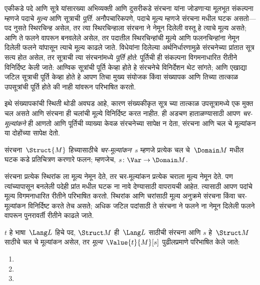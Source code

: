 \begin{explain}
एकीकडे पदे आणि सूत्रे यांसारख्या अभिव्यक्ती आणि दुसरीकडे
संरचना यांना जोडणाऱ्या मूलभूत संकल्पना म्हणजे पदाचे
\emph{मूल्य} आणि सूत्राची \emph{पूर्ति}. अनौपचारिकपणे,
पदाचे मूल्य म्हणजे संरचना मधील घटक असतो---पद
नुसते स्थिरचिन्ह असेल, तर त्या स्थिरचिन्हाला संरचना ने नेमून
दिलेली वस्तू हे त्याचे मूल्य असते; आणि ते फलने वापरून
बनवलेले असेल, तर पदातील स्थिरचिन्हांची मूल्ये आणि फलनचिन्हांना
नेमून दिलेली फलने यांपासून त्याचे मूल्य काढले जाते. विधेयांना
दिलेल्या अर्थनिर्धारणामुळे संरचनेच्या प्रांतात सूत्र सत्य
होत असेल, तर सूत्राची त्या संरचनांमध्ये \emph{पूर्ति
होते}. पूर्तिची ही संकल्पना विगमनाधारित रीतीने विनिर्दिष्ट केली जाते:
आण्विक सूत्रांची पूर्ति केव्हा होते हे संरचनेचे
विनिर्देशन थेट सांगते; आणि एखाद्या जटिल सूत्राची पूर्ति केव्हा
होते हे आपण तिचा मुख्य संयोजक किंवा संख्यापक आणि तिच्या तात्काळ
उपसूत्रांची पूर्ति होते की नाही यांवरून परिभाषित करतो.

इथे संख्यापकांची स्थिती थोडी अवघड आहे, कारण संख्यकीकृत सूत्र
च्या तात्काळ उपसूत्रामध्ये एक मुक्त चल असते आणि
संरचना ही चलांची मूल्ये विनिर्दिष्ट करत नाहीत.
ही अडचण हाताळण्यासाठी आपण \emph{चर-मूल्यांकने} ही आणतो आणि पूर्तिची
व्याख्या केवळ संरचनेच्या सापेक्ष न देता, संरचना आणि
चल चे मूल्यांकन या दोहोंच्या सापेक्ष देतो.
\end{explain}

\begin{defn}[चर-मूल्यांकन]
संरचना~$\Struct{M}$ हिच्यासाठीचे \emph{चर-मूल्यांकन}~$s$
म्हणजे प्रत्येक चल चे~$\Domain M$ मधील घटक कडे
प्रतिचित्रण करणारे फलन; म्हणजेच, $s\colon \Var \to \Domain M$.
\end{defn}

\begin{explain}
संरचना प्रत्येक स्थिरांक ला मूल्य नेमून देते, तर
चर-मूल्यांकन प्रत्येक चराला मूल्य नेमून देते. पण त्यांच्यापासून बनलेली
पदेही प्रांत मधील घटक ना नावे देण्यासाठी वापरायची आहेत.
त्यासाठी आपण पदांचे मूल्य विगमनाधारित रीतीने परिभाषित करतो.
स्थिरांक आणि चरांसाठी मूल्य अनुक्रमे संरचना किंवा
चर-मूल्यांकन विनिर्दिष्ट करते तेच असते; अधिक जटिल पदांसाठी ते
संरचना ने फलने ना नेमून दिलेली फलने वापरून पुनरावर्ती
रीतीने काढले जाते.
\end{explain}

\begin{defn}[पदांचे मूल्य]
$t$ हे भाषा~$\Lang L$ हिचे पद, $\Struct M$ ही~$\Lang L$ साठीची
संरचना आणि $s$ हे~$\Struct M$ साठीचे चल चे
मूल्यांकन असेल, तर \emph{मूल्य}~$\Value{t}{M}[s]$ पुढीलप्रमाणे
परिभाषित केले जाते:
\begin{enumerate}
\item {}
\item {}
\item {}
\end{enumerate}
\end{defn}

